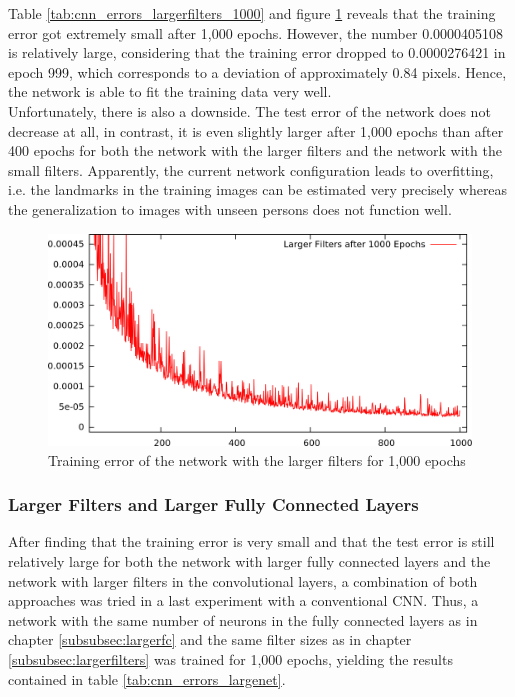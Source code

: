 \documentclass[11pt, a4paper]{article}
\begin{document}


Table \ref{tab:cnn_errors_largerfilters_1000} and figure \ref{fig:cnn_largerfilters_1000} reveals that the training error got extremely small after 1,000 epochs. However, the number 0.0000405108 is relatively large, considering that the training error dropped to 0.0000276421 in epoch 999, which corresponds to a deviation of approximately 0.84 pixels. Hence, the network is able to fit the training data very well.
\\
Unfortunately, there is also a downside. The test error of the network does not decrease at all, in contrast, it is even slightly larger after 1,000 epochs than after 400 epochs for both the network with the larger filters and the network with the small filters. Apparently, the current network configuration leads to overfitting, i.e. the landmarks in the training images can be estimated very precisely whereas the generalization to images with unseen persons does not function well.

\begin{figure}[h!]
	\centering
	\includegraphics[width=\textwidth]{results/cnn_largerfilters_1000.png}
	\caption{Training error of the network with the larger filters for 1,000 epochs}
	\label{fig:cnn_largerfilters_1000}
\end{figure}

\subsubsection{Larger Filters and Larger Fully Connected Layers}

After finding that the training error is very small and that the test error is still relatively large for both the network with larger fully connected layers and the network with larger filters in the convolutional layers, a combination of both approaches was tried in a last experiment with a conventional \ac{CNN}. Thus, a network with the same number of neurons in the fully connected layers as in chapter \ref{subsubsec:largerfc} and the same filter sizes as in chapter \ref{subsubsec:largerfilters} was trained for 1,000 epochs, yielding the results contained in table \ref{tab:cnn_errors_largenet}.
\end{document}

